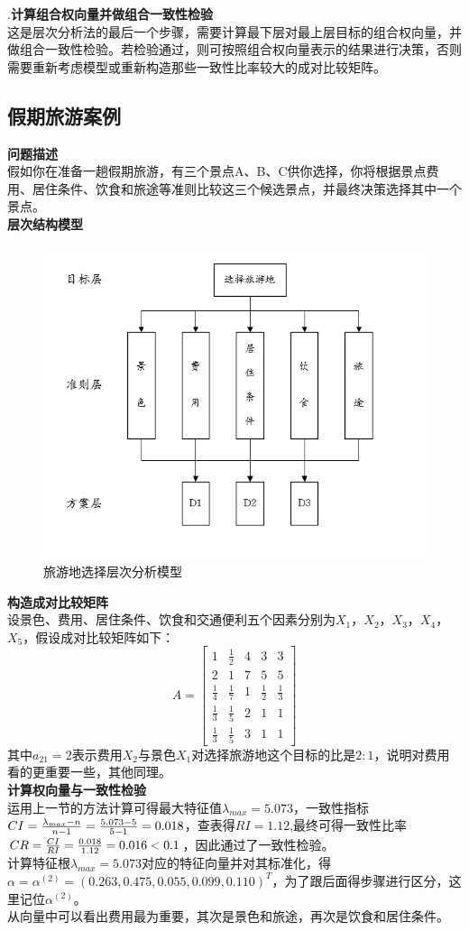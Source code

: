 \documentclass[openany]{progbookcn}
\begin{document}
.{\bf 计算组合权向量并做组合一致性检验}\\
\indent 这是层次分析法的最后一个步骤，需要计算最下层对最上层目标的组合权向量，并做组合一致性检验。若检验通过，则可按照组合权向量表示的结果进行决策，否则需要重新考虑模型或重新构造那些一致性比率较大的成对比较矩阵。
\subsection{假期旅游案例}
\noindent \textbf{问题描述}\\
\indent 假如你在准备一趟假期旅游，有三个景点A、B、C供你选择，你将根据景点费用、居住条件、饮食和旅途等准则比较这三个候选景点，并最终决策选择其中一个景点。\\
\noindent \textbf{层次结构模型}
\begin{figure}[H]
\centering
\includegraphics[width=0.6 \textwidth]{figs/chapter3/旅游地选择层次分析模型}
\caption{旅游地选择层次分析模型}
\end{figure}
\noindent \textbf{构造成对比较矩阵}\\
\indent 设景色、费用、居住条件、饮食和交通便利五个因素分别为$X_1$，$X_2$，$X_3$，$X_4$，$X_5$，假设成对比较矩阵如下：
\begin{equation}\nonumber
A = \left[ {\begin{array}{*{20}{c}}
1&{\frac{1}{2}}&4&3&3\\
2&1&7&5&5\\
{\frac{1}{4}}&{\frac{1}{7}}&1&{\frac{1}{2}}&{\frac{1}{3}}\\
{\frac{1}{3}}&{\frac{1}{5}}&2&1&1\\
{\frac{1}{3}}&{\frac{1}{5}}&3&1&1
\end{array}} \right]
\end{equation}
\indent 其中$a_{21}=2$表示费用$X_2$与景色$X_1$对选择旅游地这个目标的比是$2:1$，说明对费用看的更重要一些，其他同理。\\
\noindent \textbf{计算权向量与一致性检验}\\
\indent 运用上一节的方法计算可得最大特征值$\lambda_{max}=5.073$，一致性指标$CI={{\lambda_{max}-n}\over{n-1}}={{5.073-5}\over{5-1}}=0.018$，查表得$RI=1.12$,最终可得一致性比率$CR={{CI}\over{RI}}={0.018\over 1.12}=0.016<0.1$，因此通过了一致性检验。\\
\indent 计算特征根$\lambda_{max}=5.073$对应的特征向量并对其标准化，得$\alpha=\alpha^{(2)}=(0.263,0.475,0.055,0.099,0.110)^T$，为了跟后面得步骤进行区分，这里记位$\alpha^{(2)}$。\\
\indent 从向量中可以看出费用最为重要，其次是景色和旅途，再次是饮食和居住条件。
\end{document}
